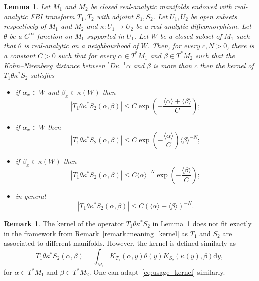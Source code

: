 \documentclass[10pt]{amsart}
\newtheorem{lemm}[theo]{Lemma}\newtheorem{prop}[theo]{Proposition}\newtheorem{coro}[theo]{Corollary}\newtheorem{conj}[theo]{Conjecture}
\theoremstyle{definition}\newtheorem{defi}[theo]{Definition}\newtheorem{rema}[theo]{Remark}\newtheorem{exam}[theo]{Example}\newtheorem{exem}[theo]{Example}\newtheorem{nota}[theo]{Notation}
\newcommand{\p}[1]{\left(#1\right)}
\newcommand{\va}[1]{\left|#1\right|}
\newcommand{\brac}[1]{\langle #1 \rangle}
\newcommand{\rmd}{\mathrm{d}}
\begin{document}
\begin{lemm}\label{lemma:chgt_manifold}
Let $M_1$ and $M_2$ be closed real-analytic manifolds endowed with real-analytic FBI transform $T_1,T_2$ with adjoint $S_1,S_2$. Let $U_1,U_2$ be open subsets respectively of $M_1$ and $M_2$ and $\kappa : U_1 \to U_2$ be a real-analytic diffeomorphism. Let $\theta$ be a $C^\infty$ function on $M_1$ supported in $U_1$. Let $W$ be a closed subset of $M_1$ such that $\theta$ is real-analytic on a neighbourhood of $W$. Then, for every $c,N > 0$, there is a constant $C > 0$ such that for every $\alpha \in T^* M_1$ and $\beta \in T^* M_2$ such that the Kohn--Nirenberg distance between ${}^t D \kappa^{-1} \alpha$ and $\beta$ is more than $c$ then the kernel of $T_1 \theta \kappa^* S_2$ satisfies
\begin{itemize}
\item if $\alpha_x \in W$ and $\beta_x \in \kappa(W)$ then
\begin{equation*}
\va{T_1 \theta \kappa^* S_2(\alpha,\beta)} \leq C \exp\p{- \frac{\brac{\alpha} + \brac{\beta}}{C}};
\end{equation*}
\item if $\alpha_x \in W$ then
\begin{equation*}
\va{T_1 \theta \kappa^* S_2(\alpha,\beta)} \leq C \exp\p{- \frac{\brac{\alpha}}{C}} \brac{\beta}^{-N};
\end{equation*}
\item if $\beta_x \in \kappa(W)$ then
\begin{equation*}
\va{T_1 \theta \kappa^* S_2(\alpha,\beta)} \leq C \brac{\alpha}^{-N} \exp\p{- \frac{\brac{\beta}}{C}};
\end{equation*}
\item in general
\begin{equation*}
\va{T_1 \theta \kappa^* S_2(\alpha,\beta)} \leq C \p{\brac{\alpha} + \brac{\beta}}^{-N}.
\end{equation*}
\end{itemize}
\end{lemm}

\begin{rema}
The kernel of the operator $T_1 \theta \kappa^* S_2$ in Lemma~\ref{lemma:chgt_manifold} does not fit exactly in the framework from Remark~\ref{remark:meaning_kernel} as $T_1$ and $S_2$ are associated to different manifolds. However, the kernel is defined similarly as
\begin{equation*}
T_1 \theta \kappa^* S_2 (\alpha,\beta) = \int_{M_1} K_{T_1}(\alpha,y)\theta(y) K_{S_2}(\kappa(y), \beta) \rmd y,
\end{equation*}
for $\alpha \in T^* M_1$ and $\beta \in T^* M_2$. One can adapt~\eqref{eq:usage_kernel} similarly.
\end{rema}
\end{document}
